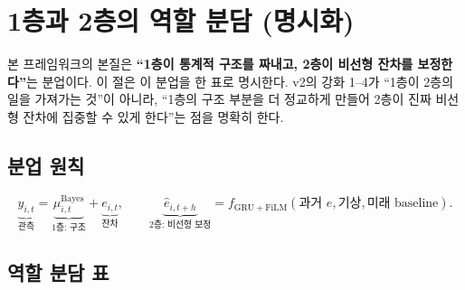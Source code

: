 \documentclass[11pt,a4paper]{article}
\begin{document}
\section{1층과 2층의 역할 분담 (명시화)}
\label{sec:role_split}

본 프레임워크의 본질은 \textbf{``1층이 통계적 구조를 짜내고, 2층이 비선형 잔차를 보정한다''}는 분업이다. 이 절은 이 분업을 한 표로 명시한다. v2의 강화 1--4가 ``1층이 2층의 일을 가져가는 것''이 아니라, ``1층의 구조 부분을 더 정교하게 만들어 2층이 진짜 비선형 잔차에 집중할 수 있게 한다''는 점을 명확히 한다.

\subsection{분업 원칙}

\begin{equation*}
    \underbrace{y_{i,t}}_{\text{관측}} = \underbrace{\mu^{\mathrm{Bayes}}_{i,t}}_{\text{1층: 구조}} + \underbrace{e_{i,t}}_{\text{잔차}},\qquad
    \underbrace{\hat e_{i,t+h}}_{\text{2층: 비선형 보정}} = f_{\mathrm{GRU+FiLM}}(\text{과거 } e, \text{기상}, \text{미래 baseline}).
\end{equation*}

\subsection{역할 분담 표}
\end{document}

